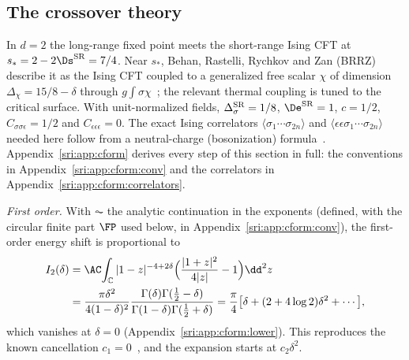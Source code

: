 \subsection{The crossover theory}
In $d=2$ the long-range fixed point meets the short-range Ising CFT at $s_*=2-2\Ds^{\rm SR}=7/4$. Near $s_*$,
Behan, Rastelli, Rychkov and Zan (BRRZ) describe it as the Ising CFT coupled to a generalized free scalar $\chi$ of
dimension $\Delta_\chi=15/8-\delta$ through $g\int\sigma\chi$~\cite{sri:Behan:2017dwr,sri:Behan:2017emf}; the relevant
thermal coupling is tuned to the critical surface. With unit-normalized fields, $\Delta_\sigma^{\rm SR}=1/8$,
$\De^{\rm SR}=1$, $c=1/2$, $C_{\sigma\sigma\epsilon}=1/2$ and $C_{\epsilon\epsilon\epsilon}=0$. The exact Ising
correlators $\langle\sigma_1\cdots\sigma_{2n}\rangle$ and $\langle\epsilon\epsilon\sigma_1\cdots\sigma_{2n}\rangle$
needed here follow from a neutral-charge (bosonization) formula~\cite{sri:Ardonne:2010zz}. Appendix~\ref{sri:app:cform} derives
every step of this section in full: the conventions in Appendix~\ref{sri:app:cform:conv} and the correlators in
Appendix~\ref{sri:app:cform:correlators}.

\emph{First order.} With $\AC$ the analytic continuation in the exponents (defined, with the circular finite part
$\FP$ used below, in Appendix~\ref{sri:app:cform:conv}), the first-order energy shift is proportional to
\begin{equation}
\begin{aligned}
 I_2(\delta)&=\AC\!\int_{\mathbb C}|1-z|^{-4+2\delta}\Bigl(\frac{|1+z|^2}{4|z|}-1\Bigr)\dd^2z\\
 &=\frac{\pi \delta^2}{4(1-\delta)^2}\frac{\Gamma(\delta)\Gamma(\frac12-\delta)}{\Gamma(1-\delta)\Gamma(\frac12+\delta)}
 =\frac\pi4\bigl[\delta+(2+4\log2)\delta^2+\cdots\bigr],
\end{aligned}
\end{equation}
which vanishes at $\delta=0$ (Appendix~\ref{sri:app:cform:lower}). This reproduces the known cancellation $c_1=0$~\cite{sri:Behan:2017emf}, and the expansion
starts at $c_2\delta^2$.

